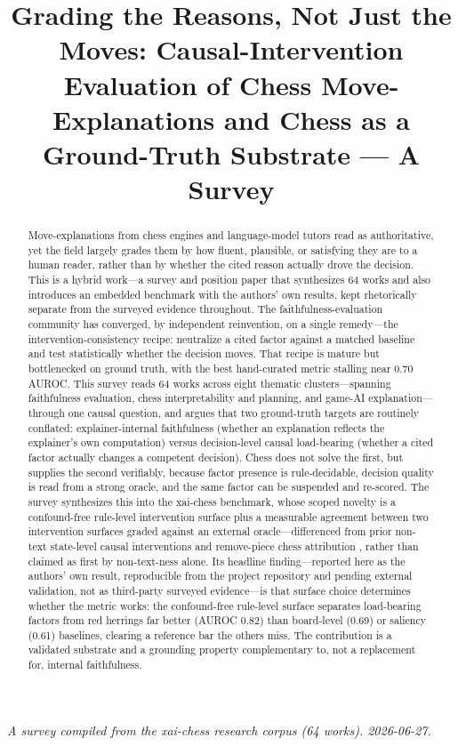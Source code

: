 \documentclass[conference]{IEEEtran}
\begin{document}
\title{Grading the Reasons, Not Just the Moves: Causal-Intervention Evaluation of Chess Move-Explanations and Chess as a Ground-Truth Substrate --- A Survey}
\author{}
\maketitle

\textit{A survey compiled from the xai-chess research corpus (64 works). 2026-06-27.}

\begin{abstract}
Move-explanations from chess engines and language-model tutors read as authoritative, yet the field largely grades them by how fluent, plausible, or satisfying they are to a human reader, rather than by whether the cited reason actually drove the decision. This is a hybrid work---a survey and position paper that synthesizes 64 works and also introduces an embedded benchmark with the authors' own results, kept rhetorically separate from the surveyed evidence throughout. The faithfulness-evaluation community has converged, by independent reinvention, on a single remedy---the intervention-consistency recipe: neutralize a cited factor against a matched baseline and test statistically whether the decision moves. That recipe is mature but bottlenecked on ground truth, with the best hand-curated metric stalling near 0.70 AUROC. This survey reads 64 works across eight thematic clusters---spanning faithfulness evaluation, chess interpretability and planning, and game-AI explanation---through one causal question, and argues that two ground-truth targets are routinely conflated: explainer-internal faithfulness (whether an explanation reflects the explainer's own computation) versus decision-level causal load-bearing (whether a cited factor actually changes a competent decision). Chess does not solve the first, but supplies the second verifiably, because factor presence is rule-decidable, decision quality is read from a strong oracle, and the same factor can be suspended and re-scored. The survey synthesizes this into the xai-chess benchmark, whose scoped novelty is a confound-free rule-level intervention surface plus a measurable agreement between two intervention surfaces graded against an external oracle---differenced from prior non-text state-level causal interventions \cite{ref32} and remove-piece chess attribution \cite{ref19}, rather than claimed as first by non-text-ness alone. Its headline finding---reported here as the authors' own result, reproducible from the project repository and pending external validation, not as third-party surveyed evidence---is that surface choice determines whether the metric works: the confound-free rule-level surface separates load-bearing factors from red herrings far better (AUROC 0.82) than board-level (0.69) or saliency (0.61) baselines, clearing a reference bar the others miss. The contribution is a validated substrate and a grounding property complementary to, not a replacement for, internal faithfulness.
\end{abstract}
\end{document}
